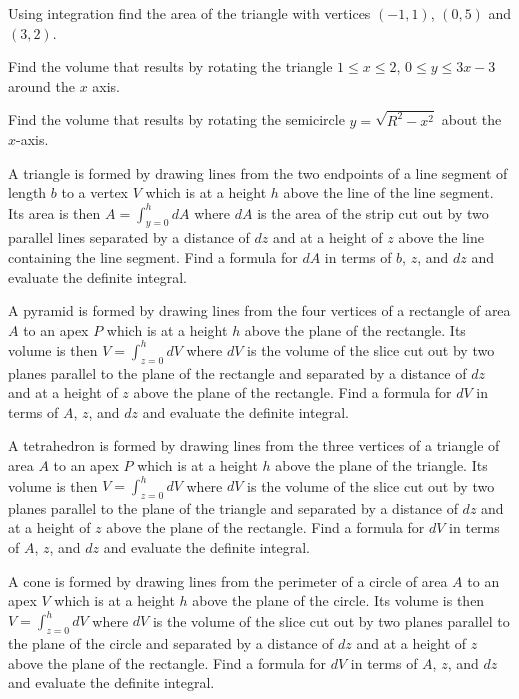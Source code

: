 \begin{multicols}{2}
  \problem Using integration find the area of the triangle with vertices
  $(-1,1)$, $(0,5)$ and $(3,2)$.


  \problem Find the volume that results by rotating the triangle $1\le x\le
  2$, $0\le y\le 3x-3$ around the $x$ axis.




  \problem \label{SphereVolume} Find the volume that results by rotating the
  semicircle $y=\sqrt{R^2-x^2}$ about the $x$-axis.



  \problem A triangle is formed by drawing lines from the two endpoints of a
  line segment of length $b$ to a vertex $V$ which is at a height $h$ above
  the line of the line segment. Its area is then $A=\int_{y=0}^h dA$ where
  $dA$ is the area of the strip cut out by two parallel lines separated by a
  distance of $dz$ and at a height of $z$ above the line containing the line
  segment. Find a formula for $dA$ in terms of $b$, $z$, and $dz$ and
  evaluate the definite integral.


  \problem A pyramid is formed by drawing lines from the four vertices of a
  rectangle of area $A$ to an apex $P$ which is at a height $h$ above the
  plane of the rectangle. Its volume is then $V=\int_{z=0}^h dV$ where $dV$
  is the volume of the slice cut out by two planes parallel to the plane of
  the rectangle and separated by a distance of $dz$ and at a height of $z$
  above the plane of the rectangle. Find a formula for $dV$ in terms of $A$,
  $z$, and $dz$ and evaluate the definite integral.


  \problem A tetrahedron is formed by drawing lines from the three vertices
  of a triangle of area $A$ to an apex $P$ which is at a height $h$ above the
  plane of the triangle. Its volume is then $V=\int_{z=0}^h dV$ where $dV$ is
  the volume of the slice cut out by two planes parallel to the plane of the
  triangle and separated by a distance of $dz$ and at a height of $z$ above
  the plane of the rectangle. Find a formula for $dV$ in terms of $A$, $z$,
  and $dz$ and evaluate the definite integral.


  \problem A cone is formed by drawing lines from the perimeter of a circle
  of area $A$ to an apex $V$ which is at a height $h$ above the plane of the
  circle. Its volume is then $V=\int_{z=0}^h dV$ where $dV$ is the volume of
  the slice cut out by two planes parallel to the plane of the circle and
  separated by a distance of $dz$ and at a height of $z$ above the plane of
  the rectangle. Find a formula for $dV$ in terms of $A$, $z$, and $dz$ and
  evaluate the definite integral.



\end{multicols}

